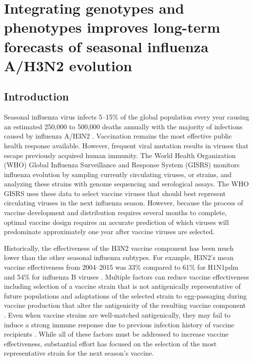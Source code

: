 \chapter{Integrating genotypes and phenotypes improves long-term forecasts of seasonal influenza A/H3N2 evolution}

\section*{Introduction}

Seasonal influenza virus infects 5--15\% of the global population every year causing an estimated 250,000 to 500,000 deaths annually with the majority of infections caused by influenza A/H3N2 \citep{flufactsheet}.
Vaccination remains the most effective public health response available.
However, frequent viral mutation results in viruses that escape previously acquired human immunity.
The World Health Organization (WHO) Global Influenza Surveillance and Response System (GISRS) monitors influenza evolution by sampling currently circulating viruses, or strains, and analyzing these strains with genome sequencing and serological assays.
The WHO GISRS uses these data to select vaccine viruses that should best represent circulating viruses in the next influenza season.
However, because the process of vaccine development and distribution requires several months to complete, optimal vaccine design requires an accurate prediction of which viruses will predominate approximately one year after vaccine viruses are selected.

Historically, the effectiveness of the H3N2 vaccine component has been much lower than the other seasonal influenza subtypes.
For example, H3N2's mean vaccine effectiveness from 2004--2015 was 33\% compared to 61\% for H1N1pdm and 54\% for influenza B viruses \citep{Belongia2016}.
Multiple factors can reduce vaccine effectiveness including selection of a vaccine strain that is not antigenically representative of future populations \citep{Belongia2016,gouma_antigenic_2020} and adaptations of the selected strain to egg-passaging during vaccine production that alter the antigenicity of the resulting vaccine component \citep{zost_contemporary_2017}.
Even when vaccine strains are well-matched antigenically, they may fail to induce a strong immune response due to previous infection history of vaccine recipients \citep{Cobey2018}.
While all of these factors must be addressed to increase vaccine effectiveness, substantial effort has focused on the selection of the most representative strain for the next season's vaccine.

